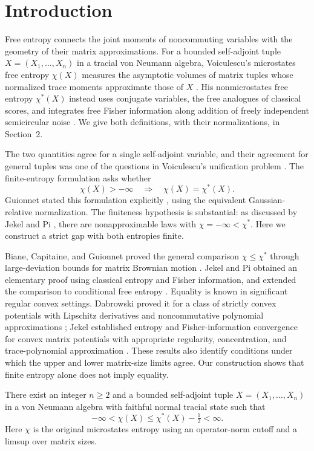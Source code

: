 \section{Introduction}

Free entropy connects the joint moments of noncommuting variables with
the geometry of their matrix approximations. For a bounded self-adjoint
tuple $X=(X_1,\ldots,X_n)$ in a tracial von Neumann algebra, Voiculescu's
microstates free entropy $\chi(X)$ measures the asymptotic volumes of
matrix tuples whose normalized trace moments approximate those of $X$
\cite{Vchi}. His nonmicrostates free entropy $\chi^*(X)$ instead uses
conjugate variables, the free analogues of classical scores, and integrates
free Fisher information along addition of freely independent semicircular
noise \cite{Vstar}. We give both definitions, with their normalizations,
in Section~2.

The two quantities agree for a single self-adjoint variable, and their
agreement for general tuples was one of the questions in Voiculescu's
unification problem \cite[Sections~3.5 and~3.8]{Vsurvey}.
The finite-entropy formulation asks whether
\[
 \chi(X)>-\infty\quad\Longrightarrow\quad\chi(X)=\chi^*(X).
\]
Guionnet stated this formulation explicitly
\cite[Conjecture~7.1]{Gsurvey}, using the equivalent Gaussian-relative
normalization. The finiteness hypothesis is substantial: as discussed
by Jekel and Pi \cite[Introduction]{JP}, there are nonapproximable laws
with $\chi=-\infty<\chi^*$. Here we construct a strict
gap with both entropies finite.

Biane, Capitaine, and Guionnet proved the general comparison
$\chi\leq\chi^*$ through large-deviation bounds for matrix Brownian
motion \cite{BCG}. Jekel and Pi obtained an elementary proof using
classical entropy and Fisher information, and extended the comparison
to conditional free entropy \cite{JP}. Equality is known in significant
regular convex settings. Dabrowski proved it for a class of strictly
convex potentials with Lipschitz derivatives and noncommutative polynomial
approximations \cite[Theorem~A]{Dab}; Jekel established
entropy and Fisher-information convergence for convex matrix potentials
with appropriate regularity, concentration, and trace-polynomial
approximation \cite[Theorem~7.1]{Jconv}. These results also identify
conditions under which the upper and lower matrix-size limits agree.
Our construction shows that finite entropy alone does not imply equality.

\begin{theorem}\label{thm:main}
There exist an integer $n\geq2$ and a bounded self-adjoint tuple
$X=(X_1,\ldots,X_n)$ in a von Neumann algebra with faithful normal
tracial state such that
\[
 -\infty<\chi(X)\leq\chi^*(X)-\tfrac12<\infty.
\]
Here $\chi$ is the original microstates entropy using an operator-norm
cutoff and a limsup over matrix sizes.
\end{theorem}

